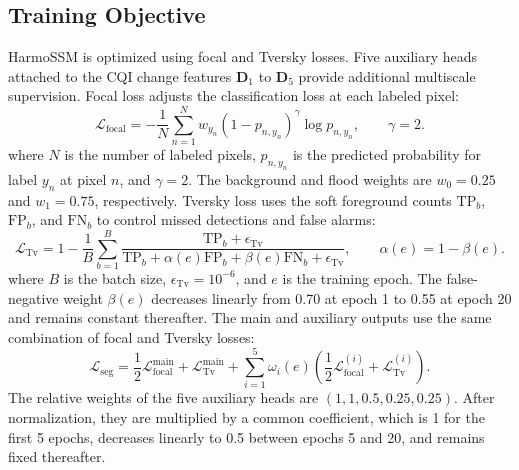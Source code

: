 \documentclass[authoryear,preprint,12pt]{elsarticle}
\begin{document}
\subsection{Training Objective}\label{sec:loss}\label{sec:training_objective}

HarmoSSM is optimized using focal and Tversky losses. Five auxiliary heads attached to the CQI change features \(\mathbf D_1\) to \(\mathbf D_5\) provide additional multiscale supervision. Focal loss \citep{lin2017focal} adjusts the classification loss at each labeled pixel:
\begin{equation}\label{eq:focal_loss}
  \mathcal{L}_{\mathrm{focal}}
  =
  -\frac{1}{N}
  \sum_{n=1}^{N}
  w_{y_n}\left(1-p_{n,y_n}\right)^{\gamma}
  \log p_{n,y_n},
  \qquad \gamma=2.
\end{equation}
where \(N\) is the number of labeled pixels, \(p_{n,y_n}\) is the predicted probability for label \(y_n\) at pixel \(n\), and \(\gamma=2\). The background and flood weights are \(w_0=0.25\) and \(w_1=0.75\), respectively. Tversky loss \citep{salehi2017tversky} uses the soft foreground counts \(\mathrm{TP}_b\), \(\mathrm{FP}_b\), and \(\mathrm{FN}_b\) to control missed detections and false alarms:
\begin{equation}\label{eq:tversky_loss}
 \mathcal{L}_{\mathrm{Tv}}=1-\frac{1}{B}\sum_{b=1}^{B}
 \frac{\mathrm{TP}_b+\epsilon_{\mathrm{Tv}}}{\mathrm{TP}_b+\alpha(e)\mathrm{FP}_b+\beta(e)\mathrm{FN}_b+\epsilon_{\mathrm{Tv}}},\qquad\alpha(e)=1-\beta(e).
\end{equation}
where \(B\) is the batch size, \(\epsilon_{\mathrm{Tv}}=10^{-6}\), and \(e\) is the training epoch. The false-negative weight \(\beta(e)\) decreases linearly from 0.70 at epoch 1 to 0.55 at epoch 20 and remains constant thereafter. The main and auxiliary outputs use the same combination of focal and Tversky losses:
\begin{equation}\label{eq:segmentation_loss}
  \mathcal{L}_{\mathrm{seg}}
  =
  \frac{1}{2}\mathcal{L}_{\mathrm{focal}}^{\mathrm{main}}
  +
  \mathcal{L}_{\mathrm{Tv}}^{\mathrm{main}}
  +
  \sum_{i=1}^{5}\omega_i(e)
  \left(
  \frac{1}{2}\mathcal{L}_{\mathrm{focal}}^{(i)}
  +
  \mathcal{L}_{\mathrm{Tv}}^{(i)}
  \right).
\end{equation}
The relative weights of the five auxiliary heads are \((1,1,0.5,0.25,0.25)\). After normalization, they are multiplied by a common coefficient, which is 1 for the first 5 epochs, decreases linearly to 0.5 between epochs 5 and 20, and remains fixed thereafter.
\end{document}
